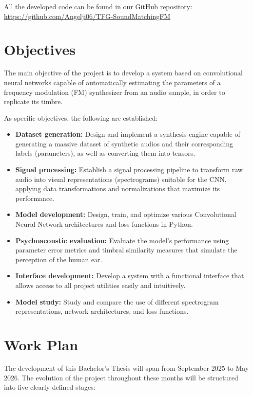 All the developed code can be found in our GitHub repository: \\ 
\url{https://github.com/Angelji06/TFG-SoundMatchingFM}

\section{Objectives}
\label{sec:objetivos}

The main objective of the project is to develop a system based on convolutional neural networks capable of automatically estimating the parameters of a frequency modulation (FM) synthesizer from an audio sample, in order to replicate its timbre.  

As specific objectives, the following are established:

\begin{itemize}
    \item \textbf{Dataset generation:} Design and implement a synthesis engine capable of generating a massive dataset of synthetic audios and their corresponding labels (parameters), as well as converting them into tensors.
    \item \textbf{Signal processing:} Establish a signal processing pipeline to transform raw audio into visual representations (spectrograms) suitable for the CNN, applying data transformations and normalizations that maximize its performance.
    \item \textbf{Model development:} Design, train, and optimize various Convolutional Neural Network architectures and loss functions in Python.
    \item \textbf{Psychoacoustic evaluation:} Evaluate the model's performance using parameter error metrics and timbral similarity measures that simulate the perception of the human ear.
    \item \textbf{Interface development:} Develop a system with a functional interface that allows access to all project utilities easily and intuitively.
    \item \textbf{Model study:} Study and compare the use of different spectrogram representations, network architectures, and loss functions.
\end{itemize}

\section{Work Plan}
The development of this Bachelor's Thesis will span from September 2025 to May 2026. The evolution of the project throughout these months will be structured into five clearly defined stages:

